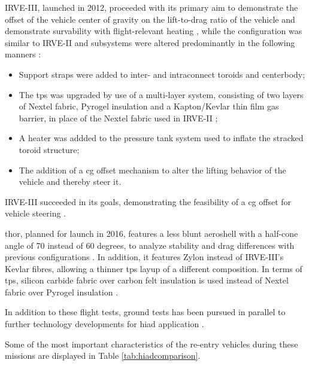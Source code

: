 IRVE-III, launched in 2012, proceeded with its primary aim to demonstrate the offset of the vehicle center of gravity on the lift-to-drag ratio of the vehicle and demonstrate survability with flight-relevant heating \cite{Dillman2012a}, while the configuration was similar to IRVE-II and subsystems were altered predominantly in the following  manners \cite{Dillman2012a}:
\begin{itemize}
\item Support straps were added to inter- and intraconnect toroids and centerbody;
\item The \gls{tps} was upgraded by use of a multi-layer system, consisting of two layers of Nextel fabric, Pyrogel insulation and a Kapton/Kevlar thin film gas barrier, in place of the Nextel fabric used in IRVE-II \cite{Dillman2012}; 
\item A heater was addded to the pressure tank system used to inflate the stracked toroid structure;
\item The addition of a \gls{cg} offset mechanism to alter the lifting behavior of the vehicle and thereby steer it.
\end{itemize}
IRVE-III succeeded in its goals, demonstrating the feasibility of a \gls{cg} offset for vehicle steering \cite{Dillman2012}.

\gls{thor}, planned for launch in 2016, features a less blunt aeroshell with a half-cone angle of 70 instead of 60 degrees, to analyze stability and drag differences with previous \cite{Hughes2005, Dillman2010, Dillman2012} configurations \cite{Dillman2014}. In addition, it features Zylon instead of IRVE-III's Kevlar fibres, allowing a thinner \gls{tps} layup of a different composition. In terms of \gls{tps}, silicon carbide fabric over carbon felt insulation is used instead of Nextel fabric over Pyrogel insulation \cite{Dillman2014}.

In addition to these flight tests, ground tests has been pursued in parallel to further technology developments for \gls{hiad} application \cite{Smith2010}.

Some of the most important characteristics of the re-entry vehicles during these missions are displayed in Table \ref{tab:hiadcomparison}.

